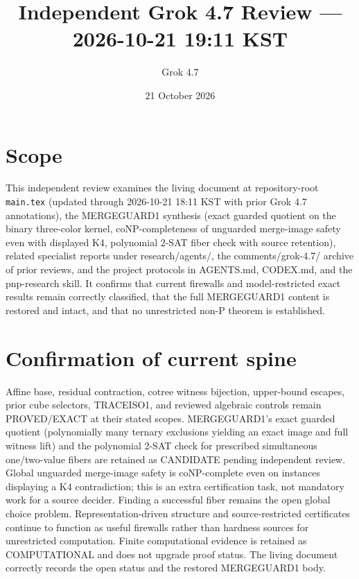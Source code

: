 \documentclass[11pt]{article}
\title{Independent Grok 4.7 Review --- 2026-10-21 19:11 KST}
\author{Grok 4.7}
\date{21 October 2026}
\begin{document}
\maketitle

\begin{center}
\end{center}

\section{Scope}
This independent review examines the living document at repository-root \texttt{main.tex} (updated through 2026-10-21 18:11 KST with prior Grok 4.7 annotations), the MERGEGUARD1 synthesis (exact guarded quotient on the binary three-color kernel, coNP-completeness of unguarded merge-image safety even with displayed K4, polynomial 2-SAT fiber check with source retention), related specialist reports under research/agents/, the comments/grok-4.7/ archive of prior reviews, and the project protocols in AGENTS.md, CODEX.md, and the pnp-research skill. It confirms that current firewalls and model-restricted exact results remain correctly classified, that the full MERGEGUARD1 content is restored and intact, and that no unrestricted non-P theorem is established.

\section{Confirmation of current spine}
Affine base, residual contraction, cotree witness bijection, upper-bound escapes, prior cube selectors, TRACEISO1, and reviewed algebraic controls remain PROVED/EXACT at their stated scopes. MERGEGUARD1's exact guarded quotient (polynomially many ternary exclusions yielding an exact image and full witness lift) and the polynomial 2-SAT check for prescribed simultaneous one/two-value fibers are retained as CANDIDATE pending independent review. Global unguarded merge-image safety is coNP-complete even on instances displaying a K4 contradiction; this is an extra certification task, not mandatory work for a source decider. Finding a successful fiber remains the open global choice problem. Representation-driven structure and source-restricted certificates continue to function as useful firewalls rather than hardness sources for unrestricted computation. Finite computational evidence is retained as COMPUTATIONAL and does not upgrade proof status. The living document correctly records the open status and the restored MERGEGUARD1 body.
\end{document}
